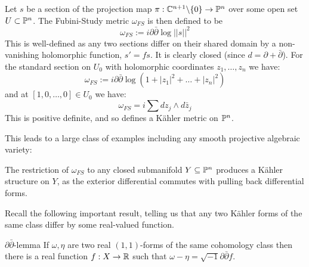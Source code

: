 \begin{example}
Let \(s\) be a section of the projection map \(\pi: \mathbb{C}^{n+1} \backslash \{0\} \to \mathbb{P}^n\) over some open set \(U \subset \mathbb{P}^n\). The Fubini-Study metric \(\omega_{FS}\) is then defined to be
\[
\omega_{FS} := i \partial \bar{\partial} \log  ||s||^2
\]
This is well-defined as any two sections differ on their shared domain by a non-vanishing holomorphic function, \(s' = fs\). It is clearly closed (since \(d = \partial + \bar{\partial}\)). For the standard section on \(U_0\) with holomorphic coordinates \(z_1,\dots,z_n\) we have:
\[
\omega_{FS} := i \partial \bar{\partial} \log ( 1 + |z_1|^2 + \dots + |z_n|^2)
\]
and at \([1,0,\dots,0] \in U_0\) we have:
\[
\omega_{FS} = i \sum dz_j \wedge d \bar{z}_j
\]
This is positive definite, and so defines a K\"ahler metric on \(\mathbb{P}^n\).
\end{example}
This leads to a large class of examples including any smooth projective algebraic variety:
\begin{example}
The restriction of \(\omega_{FS}\) to any closed submanifold \(Y \subseteq \mathbb{P}^n\) produces a K\"ahler structure on \(Y\), as the exterior differential commutes with pulling back differential forms.
\end{example}
Recall the following important result, telling us that any two K\"ahler forms of the same class differ by some real-valued function.
\begin{namedthm}{\(\partial \bar{\partial}\)-lemma}
If \(\omega, \eta\) are two real \((1,1)\)-forms of the same cohomology class then there is a real function \(f: X \to \mathbb{R}\) such that \(\omega - \eta = \sqrt{-1} \partial \bar{\partial} f\).
\end{namedthm}
